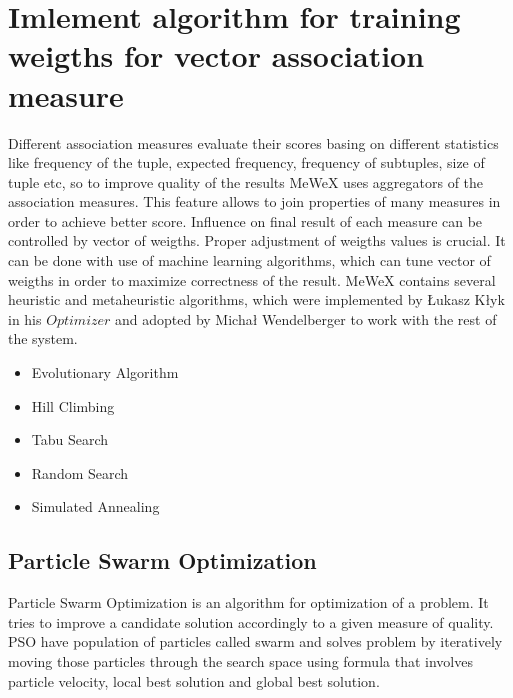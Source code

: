 \chapter{Imlement algorithm for training weigths for vector association measure}

Different association measures evaluate their scores basing on different statistics like frequency of the tuple, 
expected frequency, frequency of subtuples, size of tuple etc, so to improve quality of the results MeWeX uses 
aggregators of the association measures. This feature allows to join properties of many measures in order to achieve 
better score. Influence on final result of each measure can be controlled by vector of weigths. Proper adjustment 
of weigths values is crucial. It can be done with use of machine learning algorithms, which can tune vector of weigths 
in order to maximize correctness of the result. MeWeX contains several heuristic and metaheuristic algorithms, 
which were implemented by Łukasz Kłyk in his \(Optimizer\) and adopted by Michał Wendelberger to work with the rest of the system.
\begin{itemize}
    \setlength\itemsep{0em}
    \item Evolutionary Algorithm 
    \item Hill Climbing 
    \item Tabu Search 
    \item Random Search 
    \item Simulated Annealing
\end{itemize}

\section{Particle Swarm Optimization}\label{pso_def}

Particle Swarm Optimization is an algorithm for optimization of a problem. It tries to improve a candidate solution 
accordingly to a given measure of quality. PSO have population of particles called swarm and solves problem by iteratively moving those particles 
through the search space using formula that involves particle velocity, local best solution and global best solution. 

